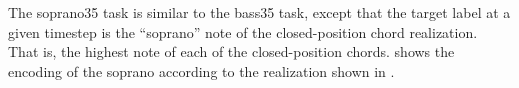 
The \gls{soprano35} task is similar to the \gls{bass35}
task, except that the target label at a given timestep is
the ``soprano'' note of the \gls{closed-position} chord
realization. That is, the highest note of each of the
\gls{closed-position} chords.  shows
the encoding of the soprano according to the realization
shown in .

